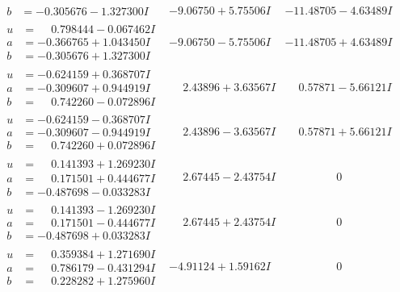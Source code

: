 \documentclass[1p]{elsarticle_modified}
\theoremstyle{definition}
\begin{document}
$$\begin{array}{c|c|c}
\begin{aligned}
b &= -0.305676 - 1.327300 I\end{aligned}
 & -9.06750 + 5.75506 I & -11.48705 - 4.63489 I \\ \hline\begin{aligned}
u &= \phantom{-}0.798444 - 0.067462 I \\
a &= -0.366765 + 1.043450 I \\
b &= -0.305676 + 1.327300 I\end{aligned}
 & -9.06750 - 5.75506 I & -11.48705 + 4.63489 I \\ \hline\begin{aligned}
u &= -0.624159 + 0.368707 I \\
a &= -0.309607 + 0.944919 I \\
b &= \phantom{-}0.742260 - 0.072896 I\end{aligned}
 & \phantom{-}2.43896 + 3.63567 I & \phantom{-}0.57871 - 5.66121 I \\ \hline\begin{aligned}
u &= -0.624159 - 0.368707 I \\
a &= -0.309607 - 0.944919 I \\
b &= \phantom{-}0.742260 + 0.072896 I\end{aligned}
 & \phantom{-}2.43896 - 3.63567 I & \phantom{-}0.57871 + 5.66121 I \\ \hline\begin{aligned}
u &= \phantom{-}0.141393 + 1.269230 I \\
a &= \phantom{-}0.171501 + 0.444677 I \\
b &= -0.487698 - 0.033283 I\end{aligned}
 & \phantom{-}2.67445 - 2.43754 I & \phantom{-0.000000 } 0 \\ \hline\begin{aligned}
u &= \phantom{-}0.141393 - 1.269230 I \\
a &= \phantom{-}0.171501 - 0.444677 I \\
b &= -0.487698 + 0.033283 I\end{aligned}
 & \phantom{-}2.67445 + 2.43754 I & \phantom{-0.000000 } 0 \\ \hline\begin{aligned}
u &= \phantom{-}0.359384 + 1.271690 I \\
a &= \phantom{-}0.786179 - 0.431294 I \\
b &= \phantom{-}0.228282 + 1.275960 I\end{aligned}
 & -4.91124 + 1.59162 I & \phantom{-0.000000 } 0 \\ \hline\begin{aligned}

\end{aligned}
\end{array}$$
\end{document}
